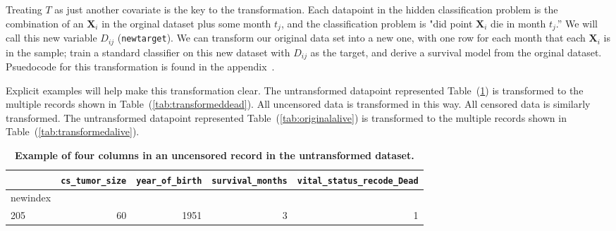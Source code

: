 \documentclass[10pt,letterpaper]{article}
\newcommand{\codewhite}[1]{\colorbox{white}{\texttt{#1}}}
\begin{document}
Treating $T$ as just another covariate is the key to the transformation. Each datapoint in the hidden classification problem is the combination of an $\mathbf{X}_{i}$ in the orginal dataset plus some month $t_{j}$, and the classification problem is "did point $\mathbf{X}_{i}$ die in month $t_{j}$.'' We will call this new variable $D_{ij}$ (\codewhite{newtarget}).
We can transform our original data set into a new one, with one row for each month that each $\mathbf{X}_{i}$ is in the sample; train a standard classifier on this new dataset with $D_{ij}$ as the target, and derive a survival model from the orginal dataset.
Psuedocode for this transformation is found in the appendix~.

Explicit examples will help make this transformation clear.
The untransformed datapoint represented Table~(\ref{tab:originaldead}) is transformed to the multiple records shown in Table~(\ref{tab:transformeddead}). All uncensored data is transformed in this way. All censored data is similarly transformed. 
The untransformed datapoint represented Table~(\ref{tab:originalalive}) is transformed to the multiple records shown in Table~(\ref{tab:transformedalive}).




\begin{table}[H]
\begin{adjustwidth}{-2.25in}{0in} %
\caption{\label{tab:originaldead} {\bf Example of four columns in an uncensored record in the untransformed dataset.}}
\begin{tabular}{lrrrr}
\toprule
{} &  \codewhite{cs\_tumor\_size} &  \codewhite{year\_of\_birth} &  \codewhite{survival\_months} &  \codewhite{vital\_status\_recode\_Dead} \\
\midrule
newindex &                &                &        &            \\
205      &             60 &           1951 &      3 &          1 \\
\bottomrule
\end{tabular}
\end{adjustwidth}
\end{table}
\end{document}
